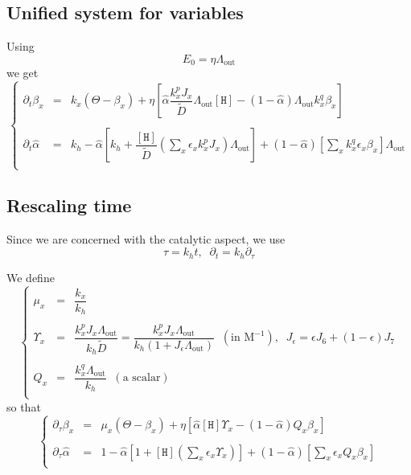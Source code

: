 \documentclass[aps,onecolumn,12pt]{revtex4}
\newcommand{\mychem}[1]{\mathtt{#1}}
\newcommand{\myconc}[1]{\left\lbrack{#1}\right\rbrack}
\newcommand{\spproton}{\mychem{H}}
\newcommand{\proton}{\myconc{\spproton}}
\newcommand{\LiAll}{\Lambda}
\newcommand{\LiAllOut}{{\LiAll}_{\mathrm{out}}}
\begin{document}
\subsection{Unified system for variables}
Using 
\begin{equation}
	E_0 = \eta \LiAllOut
\end{equation}
we get
\begin{equation}
\left\lbrace
\begin{array}{rcl}
\partial_t \beta_x  & = &  k_x \left(\Theta -\beta_x \right) +  \eta \left[ \hat\alpha \dfrac{ k_x^p J_x}{\tilde{D}} \LiAllOut \proton  -  \left(1-\hat\alpha\right) \LiAllOut k_x^q \beta_x \right] \\
\\
	\partial_t \hat\alpha & = & k_h - \hat\alpha \left\lbrack k_h+ \dfrac{\proton}{\tilde{D}} \left(\sum_x \epsilon_x k_x^p J_x \right) \LiAllOut \right] 
		+ (1-\hat\alpha) \left\lbrack {\sum_x k_x^q \epsilon_x \beta_x }  \right\rbrack \LiAllOut \\
\end{array}
\right.
\end{equation}


\subsection{Rescaling time}
Since we are concerned with the catalytic aspect, we use
\begin{equation}
	\tau = k_h t, \;\;\partial_t = k_h \partial_\tau
\end{equation}

We define 
\begin{equation}
\left\lbrace
\begin{array}{rcl}
	\mu_x      & = & \dfrac{k_x}{k_h}\\
	\\
	\Upsilon_x & = & \dfrac{k_x^pJ_x \LiAllOut}{k_h \tilde{D}}
	 = \dfrac{k_x^pJ_x \LiAllOut}{k_h\left(1+ J_\epsilon\LiAllOut\right)} \;\; (\text{in M}^{-1}),\;\; J_\epsilon= \epsilon J_6 + (1-\epsilon) J_7\\
	 \\
	 Q_x & = & \dfrac{k_x^q \LiAllOut}{k_h} \;\; (\text{a scalar})\\
\end{array}
\right.
\end{equation}
so that
\begin{equation}
\left\lbrace
\begin{array}{rcl}
\partial_\tau \beta_x  & = &  \mu_x \left(\Theta -\beta_x \right) +  \eta \left[ \hat\alpha \proton \Upsilon_x  -  \left(1-\hat\alpha\right) Q_x\beta_x \right] \\
\\
	\partial_\tau \hat\alpha & = & 1 - 
		\hat\alpha \left\lbrack 1+ \proton \left(\sum_x \epsilon_x \Upsilon_x \right)\right] 
		+ (1-\hat\alpha) \left\lbrack {\sum_x  \epsilon_x Q_x \beta_x }  \right\rbrack \\
\end{array}
\right.
\end{equation}
\end{document}
